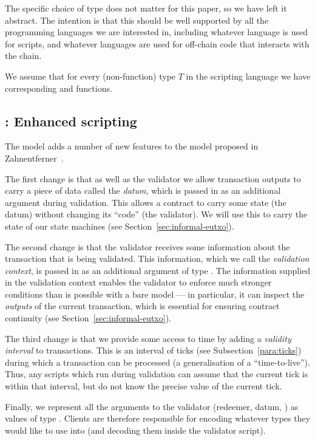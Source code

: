 The specific choice of type does not matter for this paper, so we have left it
abstract. The intention is that this should
be well supported by all the programming languages we are interested in,
including whatever language is used for scripts, and whatever languages
are used for off-chain code that interacts with the chain.

We assume that for every (non-function) type $T$ in the scripting
language we have corresponding \toData{} and \fromData{} functions.

\subsection{\EUTXO{}: Enhanced scripting}
\label{sec:eutxo}
The \EUTXO{} model adds a number of new features to the model
proposed in Zahnentferner~\cite{Zahnentferner18-UTxO}.

The first change is that as well as the validator we allow transaction
outputs to carry a piece of data called the \emph{datum}, which is
passed in as an additional argument during validation.  This allows a
contract to carry some state (the datum) without changing its ``code''
(the validator). We will use this to carry the state of our state
machines (see Section~\ref{sec:informal-eutxo}).

The second change is that the validator receives some information
about the transaction that is being validated. This information, which
we call the \textit{validation context}, is passed in as an additional
argument of type \ctx{}. The information supplied in the validation
context enables the validator to enforce much stronger conditions than
is possible with a bare \UTXO{} model --- in particular, it can
inspect the \emph{outputs} of the current transaction, which is
essential for ensuring contract continuity (see
Section~\ref{sec:informal-eutxo}).

The third change is that we provide some access to time by adding a
\emph{validity interval} to transactions.
This is an interval of ticks (see Subsection~\ref{para:ticks})
during which a transaction can be processed (a generalisation of a ``time-to-live'').
Thus, any scripts which run during validation can assume that the current tick
is within that interval, but do not know the precise value of the current tick.

Finally, we represent all the arguments to the validator (redeemer, datum,
\ctx) as values of type \Data{}. Clients are therefore responsible for encoding
whatever types they would like to use into \Data{} (and decoding them inside the
validator script).

